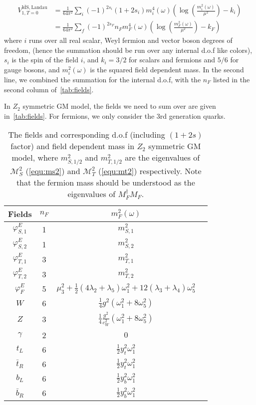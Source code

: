 \documentclass[12pt]{article}
\begin{document}
\begin{align}
    V_{1,T=0}^{\overline{\text{MS}},\text{Landau}} &= \frac{1}{64\pi^2}\sum_i(-1)^{2s_i}(1+2s_i)m_i^4(\omega)\left(\log\left(\frac{m_i^2(\omega)}{\mu^2}\right)-k_i\right) \nonumber\\
    &=\frac{1}{64\pi^2}\sum_f(-1)^{2s_F}n_Fm_F^4(\omega)\left(\log\left(\frac{m_F^2(\omega)}{\mu^2}\right)-k_F\right)
\end{align}
where $i$ runs over all real scalar, Weyl fermion and vector boson degrees of freedom, (hence the summation should be run over any internal d.o.f like colors), $s_i$ is the spin of the field $i$, and $k_i = 3/2$ for scalars and fermions and $5/6$ for gauge bosons, and $m_i^2(\omega)$ is the squared field dependent mass. In the second line, we combined the summation for the internal d.o.f, with the $n_F$ listed in the second column of~\autoref{tab:fields}.

In $Z_2$ symmetric GM model, the fields we need to sum over are given in~\autoref{tab:fields}. For fermions, we only consider the 3rd generation quarks.

\begin{table}
    \centering
    \begin{tabular}{|c|c|c|c|}
        \hline
        Fields & $n_F$ & $m_F^2(\omega)$ \\
        \hline
        $\varphi^E_{S,1}$ & 1 & $m_{S,1}^2$  \\
        \hline
        $\varphi^E_{S,2}$ & 1 & $m_{S,2}^2$ \\
        \hline
        $\varphi^E_{T,1}$ & 3 & $m_{T,1}^2$ \\
        \hline
        $\varphi^E_{T,2}$ & 3 & $m_{T,2}^2$ \\
        \hline
        $\varphi^E_F$ & 5 & $\mu_3^2+\frac{1}{2}(4\lambda_2+\lambda_5)\omega_1^2+12(\lambda_3+\lambda_4)\omega_5^2$ \\
        \hline
        $W$ & 6 & $\frac{1}{4}g^2(\omega_1^2+8\omega_5^2)$ \\
        \hline
        $Z$ & 3 & $\frac{1}{4}\frac{g^2}{c_W^2}(\omega_1^2+8\omega_5^2)$ \\
        \hline
        $\gamma$ & 2 & $0$ \\
        \hline
        $t_L$ & 6 & $\frac{1}{2}y_t^2\omega_1^2$ \\
        \hline
        $\bar{t}_R$ & 6 & $\frac{1}{2}y_t^2\omega_1^2$ \\
        \hline
        $b_L$ & 6 & $\frac{1}{2}y_b^2\omega_1^2$ \\
        \hline
        $\bar{b}_R$ & 6 & $\frac{1}{2}y_b^2\omega_1^2$ \\
        \hline
    \end{tabular}
    \caption{\label{tab:fields}The fields and corresponding d.o.f (including $(1+2s)$ factor) and field dependent mass in $Z_2$ symmetric GM model, where $m_{S,1/2}^2$ and $m_{T,1/2}^2$ are the eigenvalues of $\mathcal{M}_S^2$ (\autoref{equ:ms2})  and $\mathcal{M}_T^2$ (\autoref{equ:mt2}) respectively. Note that the fermion mass should be understood as the eigenvalues of $M_F^\dagger M_F$.}
\end{table}
\end{document}
